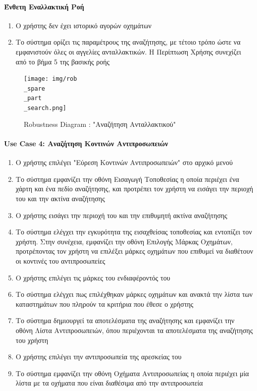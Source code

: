 \documentclass{../ol-softwaremanual}
\begin{document}
	\paragraph{Ένθετη Εναλλακτική Ροή}
	\begin{enumerate}
		\item Ο χρήστης δεν έχει ιστορικό αγορών οχημάτων
		\item Το σύστημα ορίζει τις παραμέτρους της αναζήτησης, με τέτοιο τρόπο ώστε να εμφανιστούν όλες οι αγγελίες ανταλλακτικών. Η Περίπτωση Χρήσης συνεχίζει από το βήμα 5 της βασικής ροής
	\end{enumerate}
	
	
	\begin{figure}[htbp!]
		\texttt{[image: img/rob\\\_spare\\\_part\\\_search.png]}
		\caption{\en Robustness Diagram : "\gr Αναζήτηση Ανταλλακτικού\en"\gr}
	\end{figure}
	
	\newpage
	\centering
	\paragraph{\en Use Case 4: \gr Αναζήτηση Κοντινών Αντιπροσωπειών}	
	
	\begin{enumerate}
		\item Ο χρήστης επιλέγει  \en"\gr Εύρεση Κοντινών Αντιπροσωπειών\en" \gr στο αρχικό μενού
		\item Το σύστημα εμφανίζει την οθόνη Εισαγωγή Τοποθεσίας η οποία περιέχει ένα χάρτη και ένα πεδίο αναζήτησης, και προτρέπει τον χρήστη να εισάγει την περιοχή του και την ακτίνα αναζήτησης
		\item Ο χρήστης εισάγει την περιοχή του και την επιθυμητή ακτίνα αναζήτησης		
		\item Το σύστημα ελέγχει την εγκυρότητα της εισαχθείσας τοποθεσίας και εντοπίζει τον χρήστη. Στην συνέχεια, εμφανίζει την οθόνη Επιλογής Μάρκας Οχημάτων, προτρέποντας τον χρήστη να επιλέξει μάρκες οχημάτων που επιθυμεί να διαθέτουν οι κοντινές του αντιπροσωπείες
		\item Ο χρήστης επιλέγει τις μάρκες του ενδιαφέροντός του			
		\item Το σύστημα ελέγχει πως επιλέχθηκαν μάρκες οχημάτων και ανακτά την λίστα των καταστημάτων που πληρούν τα κριτήρια που έθεσε ο χρήστης
		\item Το σύστημα δημιουργεί τα αποτελέσματα της αναζήτησης και εμφανίζει την οθόνη Λίστα Αντιπροσωπειών, όπου περιέχονται τα αποτελέσματα της αναζήτησης του χρήστη
		\item Ο χρήστης επιλέγει την αντιπροσωπεία της αρεσκείας του
		\item Το σύστημα εμφανίζει την οθόνη Οχήματα Αντιπροσωπείας η οποία περιέχει μία λίστα με τα οχήματα που είναι διαθέσιμα από την αντιπροσωπεία     	
	\end{enumerate}
	
\end{document}
